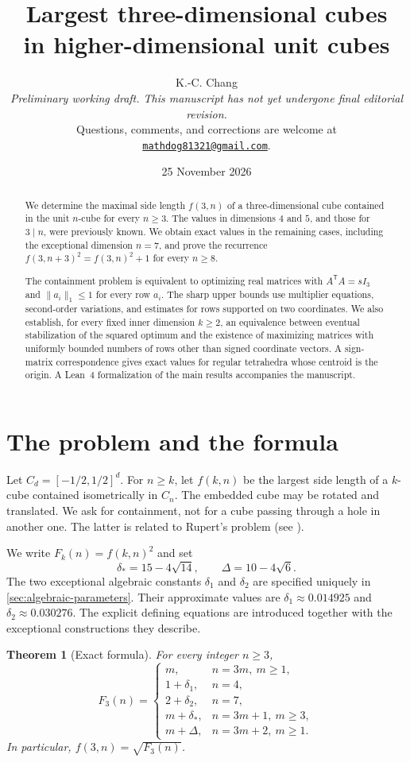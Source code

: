 \documentclass[11pt]{article}
\title{Largest three-dimensional cubes\\in higher-dimensional unit cubes}
\author{\normalsize\begin{minipage}{0.87\textwidth}\centering
  {\large K.-C. Chang}\\[5pt]
  \emph{Preliminary working draft. This manuscript has not yet undergone final editorial revision.}\\[4pt]
  Questions, comments, and corrections are welcome at\\[2pt]
  \href{mailto:mathdog81321@gmail.com}{\texttt{mathdog81321@gmail.com}}.
\end{minipage}}
\date{\normalsize 25 November 2026}
\numberwithin{equation}{section}
\newtheorem{theorem}{Theorem}[section]
\theoremstyle{definition}
\theoremstyle{definition}
\newcommand{\F}{F_3}
\newcommand{\ds}{\delta_*}
\newcommand{\Dlt}{\Delta}
\begin{document}
\maketitle
\begin{abstract}
We determine the maximal side length $f(3,n)$ of a three-dimensional
cube contained in the unit $n$-cube for every $n\ge3$. The values in
dimensions $4$ and $5$, and those for $3\mid n$, were previously known.
We obtain exact values in the remaining cases, including the exceptional
dimension $n=7$, and prove the recurrence
$f(3,n+3)^2=f(3,n)^2+1$ for every $n\ge8$.

The containment problem is equivalent to optimizing real matrices with
$A^{\mathsf T}A=sI_3$ and $\|a_i\|_1\le1$ for every row $a_i$.
The sharp upper bounds use multiplier equations, second-order variations,
and estimates for rows supported on two coordinates. We also establish,
for every fixed inner dimension $k\ge2$, an equivalence between eventual
stabilization of the squared optimum and the existence of maximizing
matrices with uniformly bounded numbers of rows other than signed
coordinate vectors. A sign-matrix correspondence gives exact values for
regular tetrahedra whose centroid is the origin. A Lean~4 formalization
of the main results accompanies the manuscript.
\end{abstract}
\medskip
{\setcounter{tocdepth}{1}\small\tableofcontents}
\newpage

\section{The problem and the formula}
\label{sec:main}
Let $C_d=[-1/2,1/2]^d$.  For $n\ge k$, let $f(k,n)$ be the largest
side length of a $k$-cube contained isometrically in $C_n$.  The embedded cube
may be rotated and translated.  We ask for containment, not for a
cube passing through a hole in another one.  The latter is related to
Rupert's problem (see \cite{HSW2018,SteiningerYurkevich2023}).

We write $F_k(n)=f(k,n)^2$ and set
\[
 \ds=15-4\sqrt{14},\qquad \Dlt=10-4\sqrt6.
\]
The two exceptional algebraic constants $\delta_1$ and $\delta_2$
are specified uniquely in \cref{sec:algebraic-parameters}.  Their
approximate values are $\delta_1\approx0.014925$ and
$\delta_2\approx0.030276$.  The explicit defining equations are
introduced together with the exceptional constructions they describe.

\begin{theorem}[Exact formula]\label{thm:sharp-values}
For every integer $n\ge3$,
\begin{equation}\label{eq:main-formula}
 \F(n)=
 \begin{cases}
 m,& n=3m,\ m\ge1,\\
 1+\delta_1,&n=4,\\
 2+\delta_2,&n=7,\\
 m+\ds,&n=3m+1,\ m\ge3,\\
 m+\Dlt,&n=3m+2,\ m\ge1.
 \end{cases}
\end{equation}
In particular, $f(3,n)=\sqrt{\F(n)}$.
\end{theorem}
\end{document}
